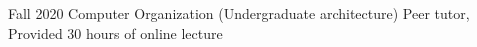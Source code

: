 

\begin{cvlist}

  \cvlistitem
    {Fall 2020 Computer Organization (Undergraduate architecture)} %
    {Peer tutor, Provided 30 hours of online lecture} %

\end{cvlist}
